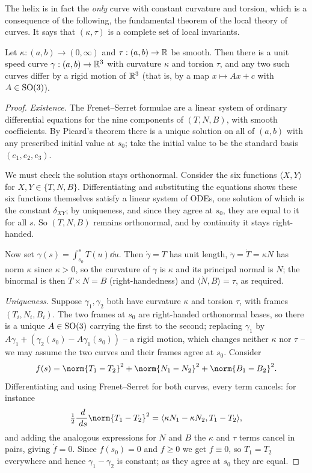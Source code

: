 \documentclass[a4paper]{scrartcl}
\begin{document}
The helix is in fact the \emph{only} curve with constant curvature and torsion, which is a consequence of the following, the fundamental theorem of the local theory of curves. It says that $(\kappa, \tau)$ is a complete set of local invariants.

\begin{theorem}
    Let $\kappa: (a,b) \rightarrow (0, \infty)$ and $\tau : (a,b) \rightarrow \mathbb{R}$ be smooth. Then there is a unit speed curve $\gamma: (a,b) \rightarrow \mathbb{R}^3$ with curvature $\kappa$ and torsion $\tau$, and any two such curves differ by a rigid motion of $\mathbb{R}^3$ (that is, by a map $x \mapsto Ax + c$ with $A \in \operatorname{SO}(3)$).
\end{theorem}
\begin{proof}
    \emph{Existence.} The Frenet--Serret formulae are a linear system of ordinary differential equations for the nine components of $(T, N, B)$, with smooth coefficients. By Picard's theorem there is a unique solution on all of $(a,b)$ with any prescribed initial value at $s_0$; take the initial value to be the standard basis $(e_1, e_2, e_3)$.

    We must check the solution stays orthonormal. Consider the six functions $\langle X, Y\rangle$ for $X, Y \in \{T, N, B\}$. Differentiating and substituting the equations shows these six functions themselves satisfy a linear system of ODEs, one solution of which is the constant $\delta_{XY}$; by uniqueness, and since they agree at $s_0$, they are equal to it for all $s$. So $(T,N,B)$ remains orthonormal, and by continuity it stays right-handed.

    Now set $\gamma(s) = \int_{s_0}^s T(u) \dd u$. Then $\dot\gamma = T$ has unit length, $\ddot\gamma = \dot T = \kappa N$ has norm $\kappa$ since $\kappa > 0$, so the curvature of $\gamma$ is $\kappa$ and its principal normal is $N$; the binormal is then $T \times N = B$ (right-handedness) and $\langle \dot N, B\rangle = \tau$, as required.

    \emph{Uniqueness.} Suppose $\gamma_1, \gamma_2$ both have curvature $\kappa$ and torsion $\tau$, with frames $(T_i, N_i, B_i)$. The two frames at $s_0$ are right-handed orthonormal bases, so there is a unique $A \in \operatorname{SO}(3)$ carrying the first to the second; replacing $\gamma_1$ by $A\gamma_1 + (\gamma_2(s_0) - A\gamma_1(s_0))$ -- a rigid motion, which changes neither $\kappa$ nor $\tau$ -- we may assume the two curves and their frames agree at $s_0$. Consider
    $$
    f(s) = \norm{T_1 - T_2}^2 + \norm{N_1 - N_2}^2 + \norm{B_1-B_2}^2.
    $$
    Differentiating and using Frenet--Serret for both curves, every term cancels: for instance
    $$
    \tfrac{1}{2}\frac{\dd}{\dd s}\norm{T_1-T_2}^2 = \langle \kappa N_1 - \kappa N_2, T_1 - T_2\rangle,
    $$
    and adding the analogous expressions for $N$ and $B$ the $\kappa$ and $\tau$ terms cancel in pairs, giving $\dot f = 0$. Since $f(s_0) = 0$ and $f \geq 0$ we get $f \equiv 0$, so $T_1 = T_2$ everywhere and hence $\gamma_1 - \gamma_2$ is constant; as they agree at $s_0$ they are equal.
\end{proof}
\end{document}
